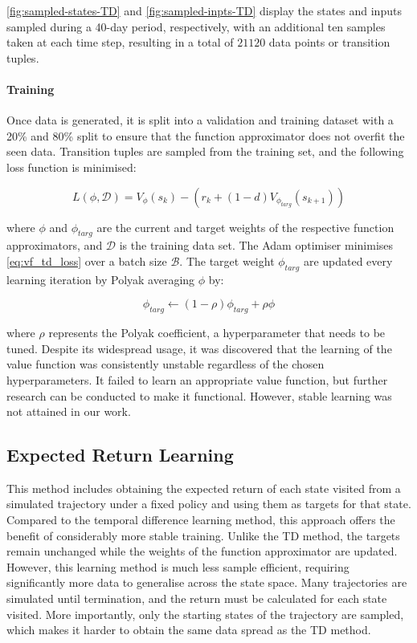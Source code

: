 \autoref{fig:sampled-states-TD} and \autoref{fig:sampled-inpts-TD} display the states and inputs sampled during a 40-day period, respectively, with an additional ten samples taken at each time step, resulting in a total of $21120$ data points or transition tuples.



\paragraph{Training}
Once data is generated, it is split into a validation and training dataset with a 20\% and 80\% split to ensure that the function approximator does not overfit the seen data. Transition tuples are sampled from the training set, and the following loss function is minimised:

\begin{equation}\label{eq:vf_td_loss}
    L(\phi, \mathcal{D}) =  V_{\phi}(s_k) - (r_k + (1-d) V_{\phi_{targ}} (s_{k+1}))
\end{equation}

where  $\phi$ and $\phi_{targ}$ are the current and target weights of the respective function approximators, and $\mathcal{D}$ is the training data set. The Adam optimiser minimises \autoref{eq:vf_td_loss} over a batch size $\mathcal{B}$. The target weight $\phi_{targ}$ are updated every learning iteration by Polyak averaging $\phi$  by:

\begin{equation}
    \phi_{targ} \leftarrow (1 - \rho) \phi_{targ} + \rho \phi
\end{equation}

where $\rho$ represents the Polyak coefficient, a hyperparameter that needs to be tuned. Despite its widespread usage, it was discovered that the learning of the value function was consistently unstable regardless of the chosen hyperparameters. It failed to learn an appropriate value function, but further research can be conducted to make it functional. However, stable learning was not attained in our work.

\subsection{Expected Return Learning}
This method includes obtaining the expected return of each state visited from a simulated trajectory under a fixed policy and using them as targets for that state. Compared to the temporal difference learning method, this approach offers the benefit of considerably more stable training. Unlike the TD method, the targets remain unchanged while the weights of the function approximator are updated. However, this learning method is much less sample efficient, requiring significantly more data to generalise across the state space. Many trajectories are simulated until termination, and the return must be calculated for each state visited. More importantly, only the starting states of the trajectory are sampled, which makes it harder to obtain the same data spread as the TD method.

